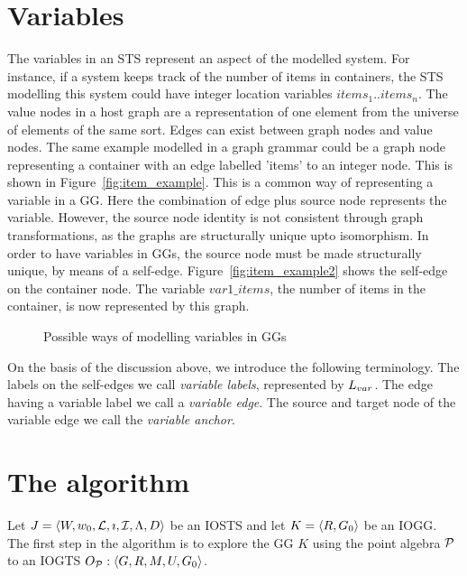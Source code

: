 \section{Variables}
The variables in an STS represent an aspect of the modelled system. For instance, if a system keeps track of the number of items in containers, the STS modelling this system could have integer location variables $\mathit{items}_1..\mathit{items}_n$. The value nodes in a host graph are a representation of one element from the universe of elements of the same sort. Edges can exist between graph nodes and value nodes. The same example modelled in a graph grammar could be a graph node representing a container with an edge labelled 'items' to an integer node. This is shown in Figure~\ref{fig:item_example}. This is a common way of representing a variable in a GG. Here the combination of edge plus source node represents the variable. However, the source node identity is not consistent through graph transformations, as the graphs are structurally unique upto isomorphism. In order to have variables in GGs, the source node must be made structurally unique, by means of a self-edge. Figure~\ref{fig:item_example2} shows the self-edge on the container node. The variable $\mathit{var1\_items}$, the number of items in the container, is now represented by this graph.

\begin{figure}[ht]
  \begin{center}
  \end{center}
  \caption{Possible ways of modelling variables in GGs}
  \label{fig:vars-in-ggs}
\end{figure}

On the basis of the discussion above, we introduce the following terminology. The labels on the self-edges we call \textit{variable labels}, represented by $L_{var}$. The edge having a variable label we call a \textit{variable edge}. The source and target node of the variable edge we call the \textit{variable anchor}.

\section{The algorithm}\label{sec:algorithm}
Let $J = \langle W,w_0,\mathcal{L},\imath,\mathcal{I},\Lambda,D\rangle$ be an IOSTS and let $K = \langle R, G_0 \rangle$ be an IOGG. The first step in the algorithm is to explore the GG $K$ using the point algebra $\mathcal{P}$ to an IOGTS $O_{\mathcal{P}}: \langle G, R, M, U, G_0 \rangle$.

